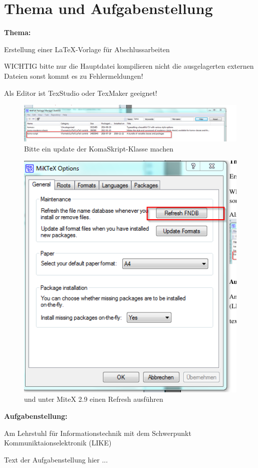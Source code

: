  

\chapter*{Thema und Aufgabenstellung}
\textbf{Thema:}\par\smallskip
 
Erstellung einer \LaTeX-Vorlage für Abschlussarbeiten
\par\smallskip  
WICHTIG bitte nur die Hauptdatei kompilieren nicht die ausgelagerten externen Dateien sonst kommt es zu Fehlermeldungen!\par
Als Editor ist TexStudio oder TexMaker geeignet!\\

\begin{figure}[h!]
  \begin{centering}
  {\includegraphics[scale=0.5]{Abbildungen/koma_script_update.png}
   \caption{Bitte ein update der KomaSkript-Klasse machen}}
  \end{centering}
  \end{figure}
  

\begin{figure}[h!]
  \begin{centering}
  {\includegraphics[scale=0.5]{Abbildungen/refresh_fndb.png}\hfill
\caption{und unter MiteX 2.9 einen Refresh ausführen}}
  \end{centering}
  \end{figure}




\par\bigskip
\textbf{Aufgabenstellung:}\par\smallskip
Am Lehrstuhl für Informationstechnik mit dem Schwerpunkt Kommuniktaionselektronik (LIKE)
\par\smallskip  
Text der Aufgabenstellung hier ...


